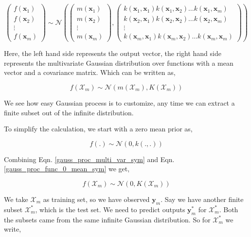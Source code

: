 \documentclass[english]{tktltiki}
\begin{document}
$$
\begin{pmatrix}
f(\mathbf{x}_1) \\
f(\mathbf{x}_2) \\
\vdots \\
f(\mathbf{x}_m)
\end{pmatrix}
\sim \mathcal{N} \left(%
\begin{pmatrix}
m(\mathbf{x}_1) \\
m(\mathbf{x}_2) \\
\vdots \\
m(\mathbf{x}_m)
\end{pmatrix}
,%
\begin{pmatrix}
k(\mathbf{x}_1, \mathbf{x}_1) k(\mathbf{x}_1, \mathbf{x}_2) \hdots k(\mathbf{x}_1, \mathbf{x}_m) \\
k(\mathbf{x}_2, \mathbf{x}_1) k(\mathbf{x}_2, \mathbf{x}_2) \hdots k(\mathbf{x}_2, \mathbf{x}_m) \\
\vdots \\
k(\mathbf{x}_m, \mathbf{x}_1) k(\mathbf{x}_m, \mathbf{x}_2) \hdots k(\mathbf{x}_m, \mathbf{x}_m) 
\end{pmatrix}\right)
$$

Here, the left hand side represents the output vector, the right hand side represents the multivariate Gaussian distribution over functions with a mean vector and a covariance matrix. Which can be written as,

\begin{equation}
f(\mathcal{X}_m) \sim \mathcal{N} (m(\mathcal{X}_m), K(\mathcal{X}_m))
\label{gauss_proc_multi_var_sym}
\end{equation}

We see how easy Gaussian process is to customize, any time we can extract a finite subset out of the infinite distribution.

To simplify the calculation, we start with a zero mean prior as,

\begin{equation}
f(.) \sim \mathcal{N} (0, k(.,.))
\label{gauss_proc_func_0_mean_sym}
\end{equation}

Combining Eqn. \ref{gauss_proc_multi_var_sym} and Eqn. \ref{gauss_proc_func_0_mean_sym} we get,

\begin{equation}
f(\mathcal{X}_m) \sim \mathcal{N} (0, K(\mathcal{X}_m))
\label{eq:gp_training}
\end{equation}

We take $\mathcal{X}_m$ as training set, so we have observed $\mathbf{y}_m$. Say we have another finite subset $\mathcal{X}_m^*$, which is the test set. We need to predict outputs $\mathbf{y}_m^*$ for $\mathcal{X}_m^*$. Both the subsets came from the same infinite Gaussian distribution. So for $\mathcal{X}_m^*$ we write,
\end{document}
